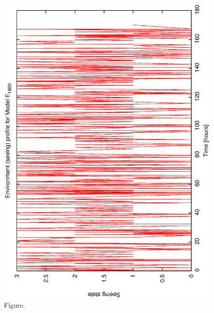 \documentclass[12pt,a4paper]{article}
\begin{document}
\begin{figure}[htbp]
 \begin{center}
  \includegraphics[scale=1.0, angle=0]{figures/e_18_prof.eps}
 \end{center}
  \caption[Figure.]
{Figure.}
\end{figure}
\clearpage
\end{document}
